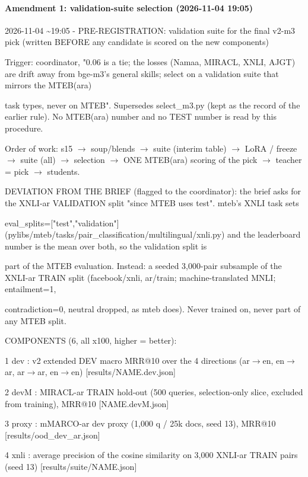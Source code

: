 \paragraph{Amendment 1: validation-suite selection (2026-11-04 19:05)}
{\footnotesize\raggedright
2026-11-04 \textasciitilde{}19:05 - PRE-REGISTRATION: validation suite for the final v2-m3 pick (written BEFORE any candidate is scored on the new components)

Trigger: coordinator, "0.06 is a tie; the losses (Namaa, MIRACL, XNLI, AJGT) are drift away from bge-m3's general skills; select on a validation suite that mirrors the MTEB(ara)

task types, never on MTEB". Supersedes select\_m3.py (kept as the record of the earlier rule). No MTEB(ara) number and no TEST number is read by this procedure.

Order of work: s15 $\to$ soup/blends $\to$ suite (interim table) $\to$ LoRA / freeze $\to$ suite (all) $\to$ selection $\to$ ONE MTEB(ara) scoring of the pick $\to$ teacher = pick $\to$ students.

DEVIATION FROM THE BRIEF (flagged to the coordinator): the brief asks for the XNLI-ar VALIDATION split "since MTEB uses test". mteb's XNLI task sets

eval\_splits=["test","validation"] (pylibs/mteb/tasks/pair\_classification/multilingual/xnli.py) and the leaderboard number is the mean over both, so the validation split is

part of the MTEB evaluation. Instead: a seeded 3,000-pair subsample of the XNLI-ar TRAIN split (facebook/xnli, ar/train; machine-translated MNLI; entailment=1,

contradiction=0, neutral dropped, as mteb does). Never trained on, never part of any MTEB split.

COMPONENTS (6, all x100, higher = better):

1 dev      : v2 extended DEV macro MRR@10 over the 4 directions (ar$\to$en, en$\to$ar, ar$\to$ar, en$\to$en)            [results/NAME.dev.json]

2 devM     : MIRACL-ar TRAIN hold-out (500 queries, selection-only slice, excluded from training), MRR@10                [NAME.devM.json]

3 proxy    : mMARCO-ar dev proxy (1,000 q / 25k docs, seed 13), MRR@10                                                    [results/ood\_dev\_ar.json]

4 xnli     : average precision of the cosine similarity on 3,000 XNLI-ar TRAIN pairs (seed 13)                            [results/suite/NAME.json]

}
